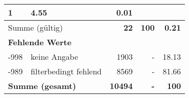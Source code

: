 \begin{longtable}{lXrrr}
       \num{1} &
       \num[round-mode=places,round-precision=2]{4,55} &
         \num[round-mode=places,round-precision=2]{0,01} \\
     \midrule
     \multicolumn{2}{l}{Summe (gültig)} &
       \textbf{\num{22}} &
     \textbf{100} &
       \textbf{\num[round-mode=places,round-precision=2]{0,21}} \\
     \multicolumn{5}{l}{\textbf{Fehlende Werte}}\\
       -998 &
       keine Angabe &
         \num{1903} &
        - &
         \num[round-mode=places,round-precision=2]{18,13} \\
       -989 &
       filterbedingt fehlend &
         \num{8569} &
        - &
         \num[round-mode=places,round-precision=2]{81,66} \\
     \midrule
     \multicolumn{2}{l}{\textbf{Summe (gesamt)}} &
          \textbf{\num{10494}} &
        \textbf{-} &
        \textbf{100} \\
     \bottomrule
     \end{longtable}
     
